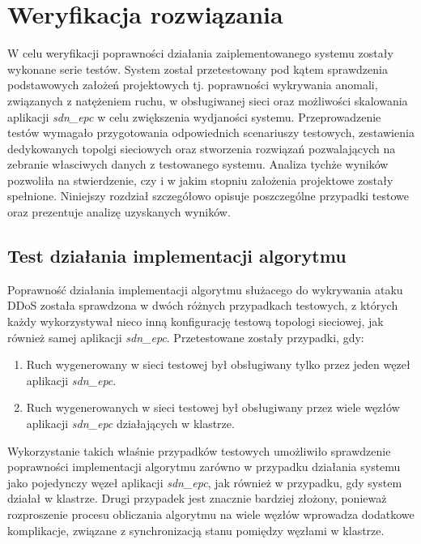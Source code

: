 \chapter{Weryfikacja rozwiązania}

W celu weryfikacji poprawności działania zaiplementowanego systemu zostały
wykonane serie testów. System został przetestowany pod kątem sprawdzenia
podstawowych założeń projektowych tj. poprawności wykrywania anomali, związanych
z natężeniem ruchu, w obsługiwanej sieci oraz możliwości skalowania
aplikacji \textit{sdn\_epc} w celu zwiększenia wydjaności systemu.
Przeprowadzenie testów wymagało przygotowania odpowiednich scenariuszy testowych,
zestawienia dedykowanych topolgi sieciowych oraz stworzenia rozwiązań
pozwalających na zebranie własciwych danych z testowanego systemu. Analiza
tychże wyników pozwoliła na stwierdzenie, czy i w jakim stopniu założenia
projektowe zostały spełnione. Niniejszy rozdział szczegółowo opisuje
poszczególne przypadki testowe oraz prezentuje analizę uzyskanych wyników.

\section{Test działania implementacji algorytmu}

 
Poprawność działania implementacji algorytmu służacego do wykrywania ataku
DDoS została sprawdzona w dwóch różnych przypadkach testowych, z których każdy
wykorzystywał nieco inną konfigurację testową topologi sieciowej, jak również
samej aplikacji \textit{sdn\_epc}. Przetestowane zostały przypadki, gdy:
\begin{enumerate}
  \item Ruch wygenerowany w sieci testowej był obsługiwany tylko przez jeden
    węzeł aplikacji \textit{sdn\_epc}.
  \item Ruch wygenerowanych w sieci testowej był obsługiwany przez wiele węzłów
    aplikacji \textit{sdn\_epc} działających w klastrze.
\end{enumerate}
Wykorzystanie takich właśnie przypadków testowych umożliwiło sprawdzenie
poprawności implementacji algorytmu zarówno w przypadku działania systemu jako
pojedynczy węzeł aplikacji \textit{sdn\_epc}, jak również w przypadku, gdy
system działał w klastrze. Drugi przypadek jest znacznie bardziej złożony,
ponieważ rozproszenie procesu obliczania algorytmu na wiele węzłów wprowadza
dodatkowe komplikacje, związane z synchronizacją stanu pomiędzy węzłami w
klastrze.

